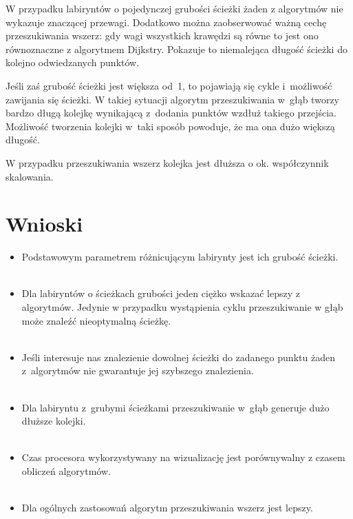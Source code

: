 \documentclass[11pt,a4paper,oneside]{mwart}
\begin{document}
W przypadku labiryntów o pojedynczej grubości ścieżki żaden z algorytmów nie wykazuje znaczącej przewagi.
Dodatkowo można zaobserwować ważną cechę przeszukiwania wszerz: gdy wagi wszystkich krawędzi są równe to jest
ono równoznaczne z algorytmem Dijkstry. 
Pokazuje to niemalejąca długość ścieżki do kolejno odwiedzanych punktów.

Jeśli zaś grubość ścieżki jest większa od~1, to pojawiają się cykle i~możliwość zawijania się ścieżki.
W takiej sytuacji algorytm przeszukiwania w~głąb tworzy bardzo długą kolejkę wynikającą 
z~dodania punktów wzdłuż takiego przejścia.
Możliwość tworzenia kolejki w~taki sposób powoduje, że ma ona dużo większą długość.

W przypadku przeszukiwania wszerz kolejka jest dłuższa o ok. współczynnik skalowania.

\section{Wnioski}

\begin{itemize}
\item Podstawowym parametrem różnicującym labirynty jest ich grubość ścieżki.\\~
\item Dla labiryntów o ścieżkach grubości jeden ciężko wskazać lepszy z algorytmów. 
Jedynie w przypadku wystąpienia cyklu przeszukiwanie w głąb może znaleźć nieoptymalną ścieżkę.\\~
\item Jeśli interesuje nas znalezienie dowolnej ścieżki do zadanego punktu żaden 
z~algorytmów nie gwarantuje jej szybszego znalezienia.\\~
\item Dla labiryntu z~grubymi ścieżkami przeszukiwanie w~głąb generuje dużo dłuższe kolejki.\\~
\item Czas procesora wykorzystywany na wizualizację jest porównywalny z czasem obliczeń algorytmów.\\~
\item Dla ogólnych zastosowań algorytm przeszukiwania wszerz jest lepszy.\\~
\end{itemize}

\appendix
\end{document}
